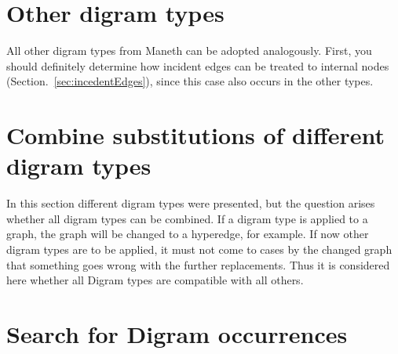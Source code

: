 \documentclass[a4paper]{scrartcl}
\begin{document}
\section{Other digram types}
All other digram types from Maneth can be adopted analogously. First, you should definitely determine how incident edges can be treated to internal nodes (Section.~\ref{sec:incedentEdges}), since this case also occurs in the other types.


\pagebreak
\section{Combine substitutions of different digram types}
In this section different digram types were presented, but the question arises whether all digram types can be combined. If a digram type is applied to a graph, the graph will be changed to a hyperedge, for example. If now other digram types are to be applied, it must not come to cases by the changed graph that something goes wrong with the further replacements. Thus it is considered here whether all Digram types are compatible with all others.

\section{Search for Digram occurrences}


\end{document}
